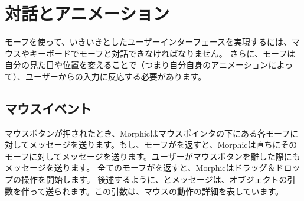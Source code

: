 \documentclass[a4paper,10pt,twoside]{book}
\begin{document}





\section{対話とアニメーション}

モーフを使って、いきいきとしたユーザーインターフェースを実現するには、マウスやキーボードでモーフと対話できなければなりません。
さらに、モーフは自分の見た目や位置を変えることで（つまり自分自身のアニメーションによって）、ユーザーからの入力に反応する必要があります。


\subsection{マウスイベント}

マウスボタンが押されたとき、Morphicはマウスポインタの下にある各モーフに対してメッセージを送ります。もし、モーフがを返すと、Morphicは直ちにそのモーフに対してメッセージを送ります。ユーザーがマウスボタンを離した際にもメッセージを送ります。
全てのモーフがを返すと、Morphicはドラッグ＆ドロップの操作を開始します。
後述するように、とメッセージは、オブジェクトの引数を伴って送られます。この引数は、マウスの動作の詳細を表しています。
\end{document}
